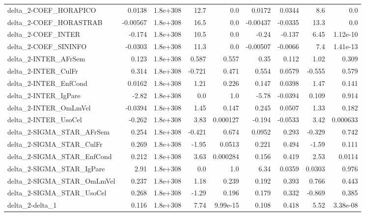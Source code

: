 \begin{tabular}{lrrrrrrrr}
delta\_2-COEF\_HORAPICO                 &      0.0138 &     1.8e+308 &    12.7 &      0.0 &     0.0172 &      0.0344 &          8.6 &           0.0 \\
delta\_2-COEF\_HORASTRAB                &    -0.00567 &     1.8e+308 &    16.5 &      0.0 &   -0.00437 &     -0.0335 &         13.3 &           0.0 \\
delta\_2-COEF\_INTER                    &      -0.174 &     1.8e+308 &    10.5 &      0.0 &      -0.24 &      -0.137 &         6.45 &      1.12e-10 \\
delta\_2-COEF\_SININFO                  &     -0.0303 &     1.8e+308 &    11.3 &      0.0 &   -0.00507 &     -0.0066 &          7.4 &      1.41e-13 \\
delta\_2-INTER\_AFrSem                  &       0.123 &     1.8e+308 &   0.587 &    0.557 &       0.35 &       0.112 &         1.02 &         0.309 \\
delta\_2-INTER\_CulFr                   &       0.314 &     1.8e+308 &  -0.721 &    0.471 &      0.554 &      0.0579 &       -0.555 &         0.579 \\
delta\_2-INTER\_EnfCond                 &      0.0162 &     1.8e+308 &    1.21 &    0.226 &      0.147 &      0.0398 &         1.47 &         0.141 \\
delta\_2-INTER\_IgPare                  &       -2.82 &     1.8e+308 &     0.0 &      1.0 &      -5.78 &     -0.0394 &        0.109 &         0.914 \\
delta\_2-INTER\_OmLmVel                 &     -0.0394 &     1.8e+308 &    1.45 &    0.147 &      0.245 &      0.0507 &         1.33 &         0.182 \\
delta\_2-INTER\_UsoCel                  &      -0.262 &     1.8e+308 &    3.83 & 0.000127 &     -0.194 &     -0.0533 &         3.42 &      0.000633 \\
delta\_2-SIGMA\_STAR\_AFrSem             &       0.254 &     1.8e+308 &  -0.421 &    0.674 &     0.0952 &       0.293 &       -0.329 &         0.742 \\
delta\_2-SIGMA\_STAR\_CulFr              &       0.269 &     1.8e+308 &   -1.95 &   0.0513 &      0.221 &       0.494 &        -1.59 &         0.111 \\
delta\_2-SIGMA\_STAR\_EnfCond            &       0.212 &     1.8e+308 &    3.63 & 0.000284 &      0.156 &       0.419 &         2.53 &        0.0114 \\
delta\_2-SIGMA\_STAR\_IgPare             &        2.91 &     1.8e+308 &     0.0 &      1.0 &       6.34 &      0.0359 &       0.0303 &         0.976 \\
delta\_2-SIGMA\_STAR\_OmLmVel            &       0.237 &     1.8e+308 &    1.18 &    0.239 &      0.192 &       0.393 &        0.766 &         0.443 \\
delta\_2-SIGMA\_STAR\_UsoCel             &       0.268 &     1.8e+308 &   -1.29 &    0.196 &      0.179 &       0.332 &       -0.869 &         0.385 \\
delta\_2-delta\_1                       &       0.116 &     1.8e+308 &    7.74 & 9.99e-15 &      0.108 &       0.418 &         5.52 &      3.38e-08 \\
\bottomrule
\end{tabular}
